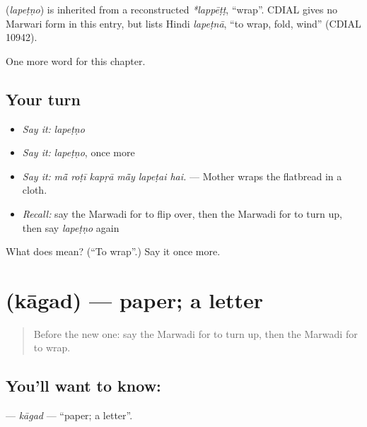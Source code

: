 \begin{cousinweb}
\textbf{} (\emph{lapeṭṇo}) is inherited from a reconstructed \emph{*lappēṭṭ}, \textquotedblleft{}wrap\textquotedblright{}. CDIAL gives no Marwari form in this entry, but lists Hindi \emph{lapeṭnā}, \textquotedblleft{}to wrap, fold, wind\textquotedblright{} (CDIAL 10942).
\end{cousinweb}

\begin{grammarlens}[title={What you've built}]
One more word for this chapter.
\end{grammarlens}

\subsection*{Your turn}
\begin{itemize}
\raggedright
  \item \emph{Say it:} \emph{lapeṭṇo}
  \item \emph{Say it:} \emph{lapeṭṇo}, once more
  \item \emph{Say it:} \emph{mā̃ roṭī kapṛā mā̃y lapeṭai hai.} — Mother wraps the flatbread in a cloth.
  \item \emph{Recall:} say the Marwadi for to flip over, then the Marwadi for to turn up, then say \emph{lapeṭṇo} again
\end{itemize}

\begin{tcolorbox}[breakable,colback=teal!4,colframe=teal!35!black,title={Before you move on}]
What does  mean? (\textquotedblleft{}To wrap\textquotedblright{}.) Say it once more.
\end{tcolorbox}
\section[\texorpdfstring{\mw{कागद} (kāgad)}{कागद (kāgad)}]{ (kāgad) — paper; a letter}

\label{lesson:MW-C215-kagad}



\begin{quote}
Before the new one: say the Marwadi for to turn up, then the Marwadi for to wrap.
\end{quote}

\subsection*{You'll want to know: }
\textbf{} — \emph{kāgad} — \textquotedblleft{}paper; a letter\textquotedblright{}.


